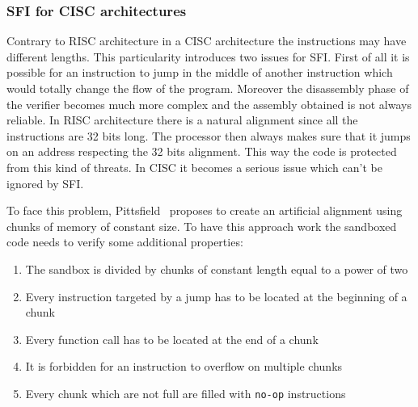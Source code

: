 \documentclass[11pt]{sdm}
\begin{document}
\subsubsection{SFI for CISC architectures}
\label{ssub:SFI for CISC architectures}
	Contrary to RISC architecture in a CISC architecture the instructions may have different lengths. This particularity introduces two issues for SFI. First of all it is possible for an instruction to jump in the middle of another instruction which would totally change the flow of the program. Moreover the disassembly phase of the verifier becomes much more complex and the assembly obtained is not always reliable.
In RISC architecture there is a natural alignment since all the instructions are 32 bits long. The processor then always makes sure that it jumps on an address respecting the 32 bits alignment. This way the code is protected from this kind of threats. In CISC it becomes a serious issue which can't be ignored by SFI.

To face this problem, Pittsfield~\cite{Mccamant_evaluatingsfi} proposes to create an artificial alignment using chunks of memory of constant size.
To have this approach work the sandboxed code needs to verify some additional properties:
\begin{enumerate}
	\item The sandbox is divided by chunks of constant length equal to a power of two
	\item Every instruction targeted by a jump has to be located at the beginning of a chunk
	\item Every function call has to be located at the end of a chunk
	\item It is forbidden for an instruction to overflow on multiple chunks
	\item Every chunk which are not full are filled with \texttt{no-op} instructions
\end{enumerate}
\end{document}
